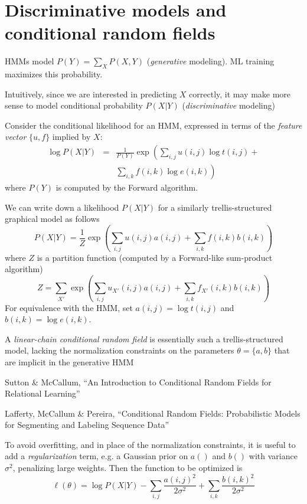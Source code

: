 \documentclass{beamer}
\begin{document}
\section{Discriminative models and conditional random fields}
\label{sec:DiscriminativeHMMs}

\begin{frame}{}

\itemb
\item HMMs model $P(Y) = \sum_X P(X,Y)$ ({\em generative} modeling). ML training maximizes this probability.
\item Intuitively, since we are interested in predicting $X$ correctly, it may make more sense to model conditional probability $P(X|Y)$ ({\em discriminative} modeling)
\item Consider the conditional likelihood for an HMM, expressed in terms of the {\em feature vector} $\{u,f\}$ implied by $X$:
\begin{eqnarray*}
\log P(X|Y) & = & \frac{1}{P(Y)} \exp \left( \sum_{i,j} u(i,j) \log t(i,j) + \right. \\ & & \left. \sum_{i,k} f(i,k) \log e(i,k) \right)
\end{eqnarray*}
where $P(Y)$ is computed by the Forward algorithm.
\iteme
\end{frame}

\begin{frame}{}
\itemb
\item We can write down a likelihood $P(X|Y)$ for a similarly trellis-structured graphical model as follows
\[
P(X|Y) = \frac{1}{Z} \exp \left( \sum_{i,j} u(i,j) a(i,j) + \sum_{i,k} f(i,k) b(i,k) \right)
\]
where $Z$ is a partition function (computed by a Forward-like sum-product algorithm)
\[
Z = \sum_{X'} \exp \left( \sum_{i,j} u_{X'}(i,j) a(i,j) + \sum_{i,k} f_{X'}(i,k) b(i,k) \right)
\]
For equivalence with the HMM, set $a(i,j)=\log t(i,j)$ and $b(i,k)=\log e(i,k)$.
\iteme
\end{frame}{}

\begin{frame}
\itemb
\item A {\em linear-chain conditional random field} is essentially such a trellis-structured model,
lacking the normalization constraints on the parameters $\theta=\{a,b\}$ that are implicit in the generative HMM
 \itemb
 \item Sutton \& McCallum, ``An Introduction to Conditional Random Fields for Relational Learning''
 \item Lafferty, McCallum \& Pereira, ``Conditional Random Fields: Probabilistic Models for Segmenting and Labeling Sequence Data''
 \iteme
\item To avoid overfitting, and in place of the normalization constraints,
it is useful to add a {\em regularization} term, e.g. a Gaussian prior on $a()$ and $b()$ with variance $\sigma^2$, penalizing large weights.
Then the function to be optimized is
\[
\ell(\theta) = \log P(X|Y) - \sum_{i,j} \frac{a(i,j)^2}{2\sigma^2} + \sum_{i,k} \frac{b(i,k)^2}{2\sigma^2}
\]
\iteme
\end{frame}
\end{document}

